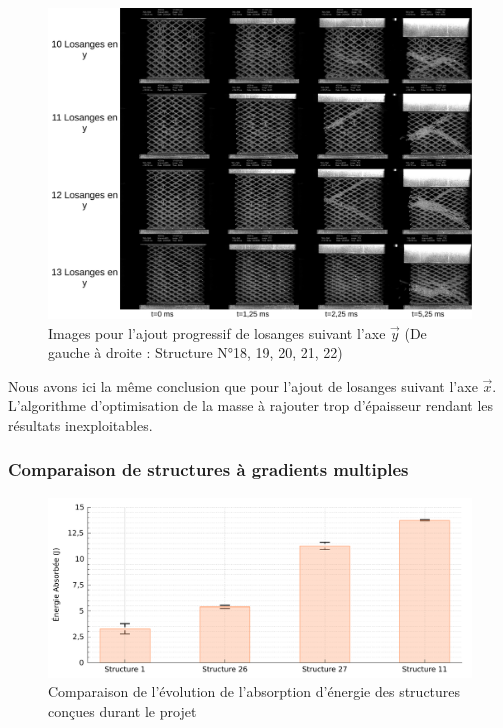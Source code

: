 \documentclass[a4paper]{article}
\begin{document}
	\begin{figure}[H]
		\centering
		\includegraphics[width=16cm]{Images/7/7_4/7_4_8/instants_y.pdf}
		\caption{Images pour l'ajout progressif de losanges suivant l'axe $\vec{y}$ (De gauche à droite : Structure N°18, 19, 20, 21, 22)}
	\end{figure}

	Nous avons ici la même conclusion que pour l'ajout de losanges suivant l'axe $\vec{x}$. L'algorithme d'optimisation de la masse à rajouter trop d'épaisseur rendant les résultats inexploitables.
	\newpage
	
	\subsubsection{Comparaison de structures à gradients multiples}
	\begin{figure}[H]
		\centering
		\includegraphics[width=16cm]{Images/7/7_4/7_4_9/comp_grad.pdf}
		\caption{Comparaison de l'évolution de l'absorption d'énergie des structures conçues durant le projet}
	\end{figure}
\end{document}
